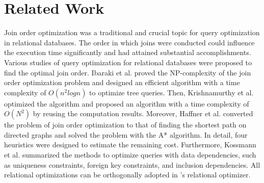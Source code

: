 \section{Related Work}
\label{sec:related-work}


 Join order optimization was a traditional and crucial topic for query optimization in relational databases. The order in which joins were conducted could influence the execution time significantly and had attained substantial accomplishments. Various studies of query optimization for relational databases were proposed to find the optimal join order. 
Ibaraki et al.\cite{nested-tods-1984} proved the NP-complexity of the join order optimization problem and designed an efficient algorithm with a time complexity of $O(n^2logn)$ to optimize tree queries. 
Then, Krishnamurthy et al.\cite{optimize-nested-vldb-1986} optimized the algorithm and proposed an algorithm with a time complexity of $O(N^2)$ by reusing the computation results. 
Moreover, Haffner et al.\cite{astarjoin} converted the problem of join order optimization to that of finding the shortest path on directed graphs and solved the problem with the A* algorithm. In detail, four heuristics were designed to estimate the remaining cost. Furthermore, Kossmann et al.\cite{data-dependency-join} summarized the methods to optimize queries with data dependencies, such as uniqueness constraints, foreign key constraints, and inclusion dependencies.
All relational optimizations can be orthogonally adopted in \name's relational optimizer.

